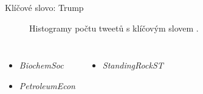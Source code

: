\documentclass[notheorems,12pt]{beamer}
\begin{document}
\begin{frame}{Klíčové slovo: Trump}
    \begin{figure}
        \centering
        \vspace{-0.7cm}
        \caption*{Histogramy počtu tweetů s klíčovým slovem \textit{}.}
    \end{figure}
    \begin{columns}
    \column{6cm}
    	\begin{itemize}
    		\item \textit{BiochemSoc}
    		\item \textit{PetroleumEcon}
    	\end{itemize}
    \column{6cm}
    	\begin{itemize}
    		\item \textit{StandingRockST}
    	\end{itemize}
    \end{columns}
\end{frame}
\end{document}
